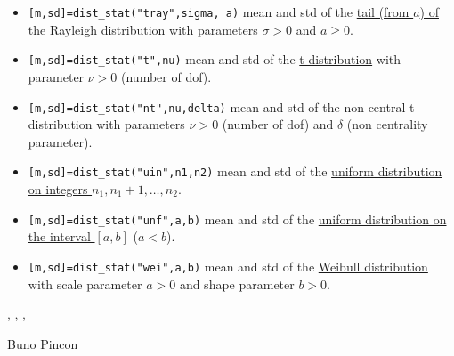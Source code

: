\begin{mandescription}
\begin{itemize}
\item {} \verb![m,sd]=dist_stat("tray",sigma, a)! mean and std 
of the \hyperlink{traypdf}{tail (from $a$) of the Rayleigh distribution} with parameters $\sigma > 0$ 
and $a \ge 0$.

\item {} \verb![m,sd]=dist_stat("t",nu)! mean and std of 
the \hyperlink{tpdf}{t distribution} with parameter $\nu > 0$ (number of dof).


\item {} \verb![m,sd]=dist_stat("nt",nu,delta)! 
mean and std of the non central t distribution with parameters $\nu > 0$ (number of dof) and
$\delta$ (non centrality parameter).


\item {} \verb![m,sd]=dist_stat("uin",n1,n2)! mean and std 
of the \hyperlink{uinpdf}{uniform distribution on integers $n_1,n_1+1,\dots,n_2$}.

\item {} \verb![m,sd]=dist_stat("unf",a,b)! mean and std  
of the \hyperlink{unfpdf}{uniform distribution on the interval $[a,b]$} ($a < b$).

\item {} \verb![m,sd]=dist_stat("wei",a,b)! mean and std of 
the \hyperlink{weipdf}{Weibull  distribution} with scale parameter $a > 0$ and shape parameter $b > 0$.

\end{itemize}

\end{mandescription}


\begin{manseealso}
  , , , 
\end{manseealso}


\begin{authors}
  Buno Pincon
\end{authors}

